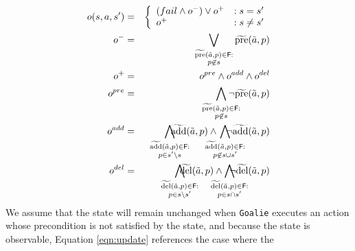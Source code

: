 \documentclass{article}
\def\goalie{{\tt Goalie}}
\begin{document}
\noindent \begin{eqnarray}
o(s, a, s') &=& \left\{ \begin{array}{ll}
(fail \wedge o^-) \vee  o^+  &: s = s'\\
o^+  & : s \not= s'
\end{array}\right. \label{eqn:update}\\
o^- &=& \bigvee\limits_{\substack{\widetilde{\text{pre}}(\tilde{a},p) \in {\sf F}:\\ p \not\in s} } \widetilde{\text{pre}}(\tilde{a},p) \label{eqn:update1} \\
o^+ &=& o^{pre} \wedge o^{add} \wedge o^{del}\label{eqn:update2}\\
o^{pre} &=& \bigwedge\limits_{\substack{\widetilde{\text{pre}}(\tilde{a},p) \in {\sf F}:\\ p \not\in s} }\hspace*{-0.5cm}\neg \widetilde{\text{pre}}(\tilde{a},p)\label{eqn:update3}  \\
o^{add} &=&  \hspace*{-.5cm}\bigwedge\limits_{\substack{\widetilde{\text{add}}(\tilde{a},p) \in {\sf F}:\\ p\in s'\backslash s} }\hspace*{-0.75cm}\widetilde{\text{add}}(\tilde{a},p)   \wedge  \hspace*{-0.5cm}\bigwedge\limits_{\substack{\widetilde{\text{add}}(\tilde{a},p) \in {\sf F}: \\ p \not\in  s\cup s'}} \hspace*{-0.75cm}\neg \widetilde{\text{add}}(\tilde{a},p)   \label{eqn:update4}\\
o^{del} &=& \hspace*{-.5cm} \bigwedge\limits_{\substack{\widetilde{\text{del}}(\tilde{a},p) \in {\sf F}: \\p \in s \backslash s'}} \hspace*{-0.75cm}\widetilde{\text{del}}(\tilde{a},p)  \wedge  \hspace*{-0.5cm}\bigwedge\limits_{\substack{\widetilde{\text{del}}(\tilde{a},p) \in {\sf F}:\\ p \in s\cap s'}} \hspace*{-0.75cm}\neg \widetilde{\text{del}}(\tilde{a},p)  \label{eqn:update5}
\end{eqnarray}
\noindent We assume that the state will remain unchanged when \goalie{} executes
an action whose precondition is not satisfied by the state, and because the
state is observable, Equation \ref{eqn:update} references the case where the
\end{document}

